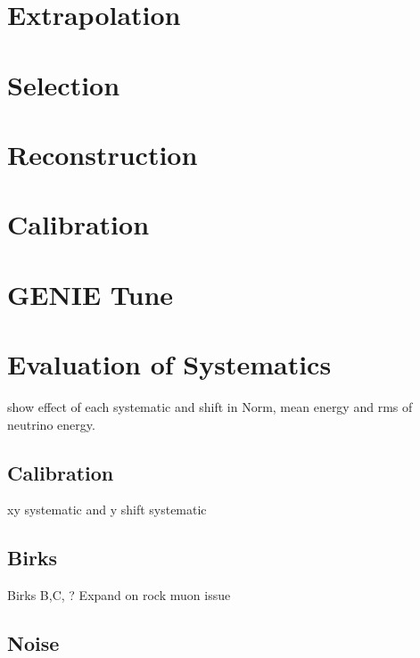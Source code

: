 


\section{Extrapolation}

\section{Selection}

\section{Reconstruction}

\section{Calibration}

\section{GENIE Tune}

\section{Evaluation of Systematics}
show effect of each systematic and shift in Norm, mean energy and rms of neutrino energy.

\subsection{Calibration}
xy systematic and y shift systematic

\subsection{Birks}
Birks B,C, ?
Expand on rock muon issue

\subsection{Noise}